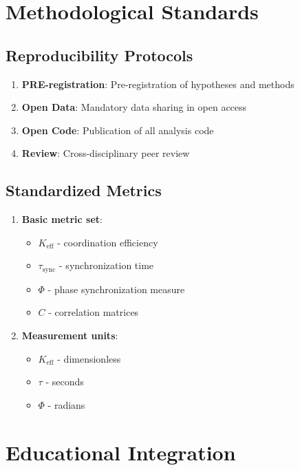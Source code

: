 \documentclass[12pt,a4paper]{article}
\begin{document}
	\section{Methodological Standards}
	
	\subsection{Reproducibility Protocols}
	
	\begin{enumerate}
		\item \textbf{PRE-registration}: Pre-registration of hypotheses and methods
		\item \textbf{Open Data}: Mandatory data sharing in open access
		\item \textbf{Open Code}: Publication of all analysis code
		\item \textbf{Review}: Cross-disciplinary peer review
	\end{enumerate}
	
	\subsection{Standardized Metrics}
	
	\begin{enumerate}
		\item \textbf{Basic metric set}:
		\begin{itemize}
			\item $K_{\mathrm{eff}}$ - coordination efficiency
			\item $\tau_{\mathrm{sync}}$ - synchronization time
			\item $\Phi$ - phase synchronization measure
			\item $C$ - correlation matrices
		\end{itemize}
		
		\item \textbf{Measurement units}:
		\begin{itemize}
			\item $K_{\mathrm{eff}}$ - dimensionless
			\item $\tau$ - seconds
			\item $\Phi$ - radians
		\end{itemize}
	\end{enumerate}
	
	\section{Educational Integration}
	
\end{document}
